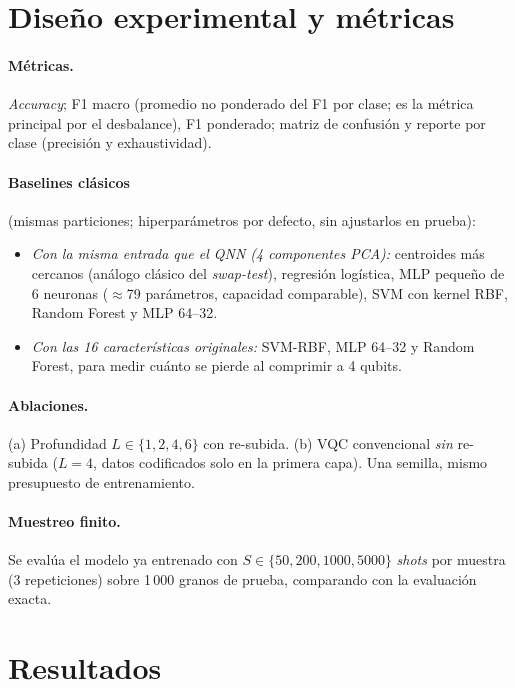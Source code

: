 \documentclass[11pt,letterpaper]{article}
\begin{document}
\section{Diseño experimental y métricas}
\paragraph{Métricas.} \emph{Accuracy}; F1 macro (promedio no ponderado del F1 por clase; es la
métrica principal por el desbalance), F1 ponderado; matriz de confusión y reporte por clase
(precisión y exhaustividad).

\paragraph{Baselines clásicos} (mismas particiones; hiperparámetros por defecto, sin ajustarlos en
prueba):
\begin{itemize}[leftmargin=*]
\item \emph{Con la misma entrada que el QNN (4 componentes PCA):} centroides más cercanos (análogo
clásico del \emph{swap-test}), regresión logística, MLP pequeño de 6 neuronas ($\approx$79 parámetros,
capacidad comparable), SVM con kernel RBF, Random Forest y MLP 64--32.
\item \emph{Con las 16 características originales:} SVM-RBF, MLP 64--32 y Random Forest, para medir
cuánto se pierde al comprimir a 4 qubits.
\end{itemize}

\paragraph{Ablaciones.} (a) Profundidad $L\in\{1,2,4,6\}$ con re-subida. (b) VQC convencional
\emph{sin} re-subida ($L=4$, datos codificados solo en la primera capa). Una semilla, mismo
presupuesto de entrenamiento.

\paragraph{Muestreo finito.} Se evalúa el modelo ya entrenado con $S\in\{50,200,1000,5000\}$
\emph{shots} por muestra (3 repeticiones) sobre 1\,000 granos de prueba, comparando con la
evaluación exacta.

\section{Resultados}
\label{sec:res}
\end{document}
